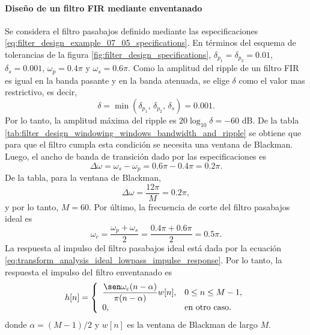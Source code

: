 \documentclass[a4paper]{report}
\begin{document}
\paragraph{Diseño de un filtro FIR mediante enventanado} Se considera el filtro pasabajos definido mediante las especificaciones \ref{eq:filter_design_example_07_05_specifications}. En términos del esquema de tolerancias de la figura \ref{fig:filter_design_specifications}, \(\delta_{p_1}=\delta_{p_2}=0.01\), \(\delta_s=0.001\), \(\omega_p=0.4\pi\) y \(\omega_s=0.6\pi\). Como la amplitud del ripple de un filtro FIR es igual en la banda pasante y en la banda atenuada, se elige \(\delta\) como el  valor mas restrictivo, es decir, 
\[
 \delta=\min(\delta_{p_1},\,\delta_{p_2},\,\delta_s)=0.001.
\]
Por lo tanto, la amplitud máxima del ripple es \(20\log_{10}\delta=-60\) dB. De la tabla \ref{tab:filter_design_windowing_windows_bandwidth_and_ripple} se obtiene que para que el filtro cumpla esta condición se necesita una ventana de Blackman. Luego, el ancho de banda de transición dado por las especificaciones es
\[
 \Delta\omega=\omega_s-\omega_p=0.6\pi-0.4\pi=0.2\pi.
\]
De la tabla, para la ventana de Blackman,
\[
 \Delta\omega=\frac{12\pi}{M}=0.2\pi,
\]
y por lo tanto, \(M=60\). Por último, la frecuencia de corte del filtro pasabajos ideal es
\[
 \omega_c=\frac{\omega_p+\omega_s}{2}=\frac{0.4\pi+0.6\pi}{2}=0.5\pi.
\]
La respuesta al impulso del filtro pasabajos ideal está dada por la ecuación 
\ref{eq:transform_analysis_ideal_lowpass_impulse_response}. Por lo tanto, la respuesta el impulso del filtro enventanado es
\[
 h[n]=\left\{ 
   \begin{array}{ll}
     \dfrac{\sen\omega_c(n-\alpha)}{\pi(n-\alpha)}w[n], & 0\leq n\leq M-1,\\ 
     0, & \textrm{en otro caso.}
   \end{array}
   \right.
\]
donde \(\alpha=(M-1)/2\) y \(w[n]\) es la ventana de Blackman de largo \(M\). 
\\
\end{document}
